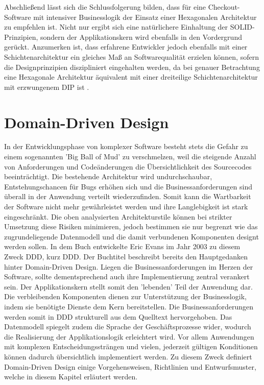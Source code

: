 Abschließend lässt sich die Schlussfolgerung bilden, dass für eine Checkout-Software mit intensiver Businesslogik der Einsatz einer Hexagonalen Architektur zu empfehlen ist. Nicht nur ergibt sich eine natürlichere Einhaltung der SOLID-Prinzipien, sondern der Applikationskern wird ebenfalls in den Vordergrund gerückt. Anzumerken ist, dass erfahrene Entwickler jedoch ebenfalls mit einer Schichtenarchitektur ein gleiches Maß an Softwarequalität erzielen können, sofern die Designprinzipien diszipliniert eingehalten werden, da bei genauer Betrachtung eine Hexagonale Architektur äquivalent mit einer dreiteilige Schichtenarchitektur mit erzwungenem \acrlong{DIP} ist \cite{Seemann.2013} \cite[S. 125ff.]{Vernon.2015}. 

\section{Domain-Driven Design}

In der Entwicklungsphase von komplexer Software besteht stets die Gefahr zu einem sogenannten 'Big Ball of Mud' zu verschmelzen, weil die steigende Anzahl von Anforderungen und Codeänderungen die Übersichtlichkeit des Sourcecodes beeinträchtigt. Die bestehende Architektur wird undurchschaubar, Entstehungschancen für Bugs erhöhen sich und die Businessanforderungen sind überall in der Anwendung verteilt wiederzufinden. Somit kann die Wartbarkeit der Software nicht mehr gewährleistet werden und ihre Langlebigkeit ist stark eingeschränkt. \cite{bbom.1999} Die oben analysierten Architekturstile können bei strikter Umsetzung diese Risiken minimieren, jedoch bestimmen sie nur begrenzt wie das zugrundeliegende Datenmodell und die damit verbundenen Komponenten designt werden sollen. In dem Buch  entwickelte Eric Evans im Jahr 2003 zu diesem Zweck \acrlong{DDD}, kurz \acrshort{DDD}. Der Buchtitel beschreibt bereits den Hauptgedanken hinter Domain-Driven Design. Liegen die Businessanforderungen im Herzen der Software, sollte dementsprechend auch ihre Implementierung zentral verankert sein. Der Applikationskern stellt somit den 'lebenden' Teil der Anwendung dar. Die verbleibenden Komponenten dienen zur Unterstützung der Businesslogik, indem sie benötigte Dienste dem Kern bereitstellen. Die Businessanforderungen werden somit in DDD strukturell aus dem Quelltext hervorgehoben. Das Datenmodell spiegelt zudem die Sprache der Geschäftsprozesse wider, wodurch die Realisierung der Applikationslogik erleichtert wird. Vor allem Anwendungen mit komplexen Entscheidungssträngen und vielen, jederzeit gültigen Konditionen können dadurch übersichtlich implementiert werden. Zu diesem Zweck definiert Domain-Driven Design einige Vorgehensweisen, Richtlinien und Entwurfsmuster, welche in diesem Kapitel erläutert werden. \cite{Evans.2011, Vernon.2015}

